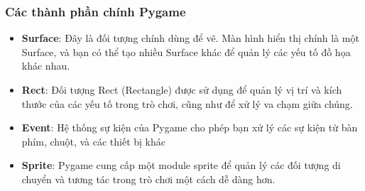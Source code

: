 \documentclass[a4paper]{article}
\begin{document}
\subsubsection{Các thành phần chính Pygame}
\begin{itemize}
    \item \textbf{Surface}: Đây là đối tượng chính dùng để vẽ. Màn hình hiển thị chính là một Surface, và bạn có thể tạo nhiều Surface khác để quản lý các yếu tố đồ họa khác nhau.
    \item \textbf{Rect}: Đối tượng Rect (Rectangle) được sử dụng để quản lý vị trí và kích thước của các yếu tố trong trò chơi, cũng như để xử lý va chạm giữa chúng.
    \item \textbf{Event}: Hệ thống sự kiện của Pygame cho phép bạn xử lý các sự kiện từ bàn phím, chuột, và các thiết bị khác
    \item \textbf{Sprite}: Pygame cung cấp một module sprite để quản lý các đối tượng di chuyển và tương tác trong trò chơi một cách dễ dàng hơn.
\end{itemize}
\end{document}
